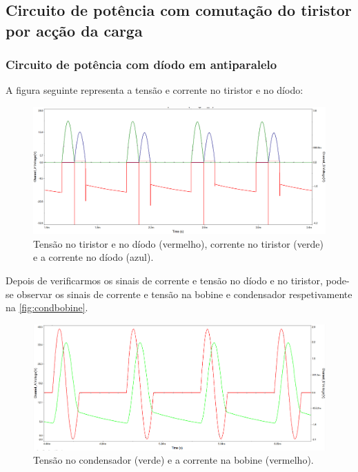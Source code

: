 \documentclass[a4paper,11pt]{article}
\numberwithin{equation}{section}
\begin{document}
\pagebreak

\subsection{Circuito de potência com comutação do tiristor por acção da carga}
\subsubsection{Circuito de potência com díodo em antiparalelo}
 A figura seguinte representa a tensão e corrente no tiristor e no díodo:
 
 \begin{figure}[h]
 	\centering
 	\includegraphics[keepaspectratio=true, scale=0.365]{img/sim/CorrentTensaodiodoeTiristor}
 	\caption{Tensão no tiristor e no díodo (vermelho), corrente no tiristor (verde) e a corrente no díodo (azul).}
 	\label{fig:dio}
 	\vspace{-0.8em}
 \end{figure}
 
 Depois de verificarmos os sinais de corrente e tensão no díodo e no tiristor, pode-se observar os sinais de corrente e tensão na bobine e condensador respetivamente na \autoref{fig:condbobine}.
 
 
 \begin{figure}[h]
 	\centering
 	\includegraphics[keepaspectratio=true, scale=0.365]{img/sim/TensaoCondCorrenBobine}
 	\caption{Tensão no condensador (verde) e a corrente na bobine (vermelho).}
 	\label{fig:condbobine}
 	\vspace{-0.8em}
 \end{figure}
 
\end{document}
